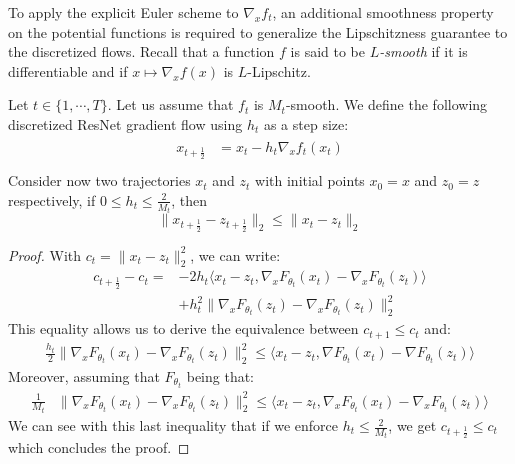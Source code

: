 To apply the explicit Euler scheme to $\nabla_x f_t$, an  additional smoothness property on the potential functions is required  to generalize the Lipschitzness guarantee to the discretized flows. Recall that a function $f$ is said to be \emph{$L$-smooth} if it is differentiable and if $x\mapsto\nabla_x f(x)$ is $L$-Lipschitz. 
\begin{prop}\label{prop:discrete_convex_potentials}
Let $t\in\{1,\cdots,T\}$. Let us assume that $f_{t}$ is $M_t$-smooth. We  define the following discretized ResNet gradient flow using $h_t$ as a step size:
\begin{align*}
    \begin{array}{ll}
    x_{t+\frac12} &= x_{t}-h_{t}\nabla_xf_{t}(x_{t})\\
  \end{array}
 \end{align*}
Consider now two trajectories $x_t$ and $z_t$ with initial points $x_0=x$ and $z_0=z$ respectively,  if $0\leq h_t\leq \frac{2}{M_t}$,  then 
$$\lVert x_{t+\frac12}-z_{t+\frac12}\rVert_2\leq \lVert x_t-z_t\rVert_2$$
\end{prop}
\begin{proof}
  With $c_t = \lVert x_t -z_t\rVert_2^2$, we can write:
  \begin{align*}
     c_{t+\frac12} - c_t = &-2 h_t \big\langle x_t - z_t, \nabla_xF_{\theta_{t}}(x_t) - \nabla_xF_{\theta_{t}}(z_t)  \big\rangle\\
     &+ h_t^2 \lVert \nabla_xF_{\theta_{t}}(z_t) - \nabla_xF_{\theta_{t}}(z_t)\rVert_2^2
  \end{align*}
  This equality allows us to derive the equivalence between  $c_{t+1} \leq c_t$ and: 
  \begin{align*}
     \frac{h_t}{2}
     \lVert  \nabla_x F_{\theta_{t}}(x_t) - \nabla_x F_{\theta_{t}}(z_t)\rVert_2^2
     \leq
     \langle x_t -z_t, \nabla F_{\theta_{t}}(x_t) - \nabla F_{\theta_{t}}(z_t) \rangle 
  \end{align*}
  Moreover, assuming that $F_{\theta_t}$ being  that:
  \begin{align*}
     \frac{1}{M_t} &\lVert \nabla_xF_{\theta_{t}}(x_t) - \nabla_xF_{\theta_{t}}(z_t)\rVert_2^2 
     \leq\big\langle x_t -z_t, \nabla_xF_{\theta_{t}}(x_t) - \nabla_xF_{\theta_{t}}(z_t) \big\rangle
  \end{align*}
  We can see with this last inequality that if we enforce  $h_t \leq \frac{2}{M_t}$, we get $c_{t+\frac12} \leq c_t$ which concludes the proof.
  \end{proof}
  



